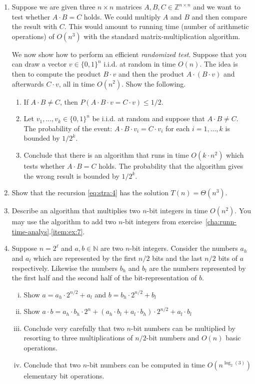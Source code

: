 \begin{enumerate}
\item Suppose we are given three $n×n$ matrices $A,B,C ∈ ℤ^{n×n}$ and we want to test whether $A ⋅ B = C$ holds. We could multiply $A$ and $B$ and then compare the result with $C$. This would amount to running time (number of arithmetic operations) of $O(n^3)$ with the standard matrix-multiplication algorithm. 

We now show how to perform an efficient \emph{randomized test}. Suppose that you can draw a vector $v ∈ \{0,1\}^n$  i.i.d. at random in time $O(n)$. The idea is then to compute the product $B ⋅v$ and then the product $A ⋅ (B ⋅v)$ and afterwards $C ⋅ v$, all in time $O(n^2)$. Show the following. 

\begin{enumerate}
\item If $A⋅B \neq C$, then $P(A ⋅ B ⋅v = C⋅v) ≤1/2$. 
\item Let $v_1,\dots,v_k∈ \{0,1\}^n$ be i.i.d. at random and suppose that  $A⋅B \neq C$. The probability of the event: $A ⋅ B ⋅v_i = C⋅v_i$ for each $i=1,\dots,k$ is bounded by $1/2^k$. 
\item Conclude that there is an algorithm that runs in time $O(k⋅n^2)$ which tests whether $A⋅B = C$ holds. The probability that the algorithm gives the wrong result is bounded by $1/2^k$. 
\end{enumerate}
\item Show that the recursion \eqref{eq:stra:4} has the solution $T(n) = Θ (n^3)$.  \label{item:str:4}
\item Describe an algorithm that multiplies two $n$-bit integers in time $O(n^2)$. You may use the algorithm to add two $n$-bit integers from exercise~\ref{cha:runn-time-analys}.\ref{item:ex:7}.  
\item Suppose $n = 2^\ell $  and $a,b ∈ ℕ$ are two $n$-bit integers. Consider the numbers $a_h$ and $a_l$ which are represented by the first $n/2$ bits and the last $n/2$ bits of $a$ respectively. Likewise the numbers $b_h$ and $b_l$ are the numbers represented by the first half and the second half of the bit-representation of $b$. 
  \begin{enumerate}[i)]
   \item Show $a = a_h ⋅ 2^{n/2} + a_l$ and  $b = b_h ⋅ 2^{n/2} + b_l$
  \item Show $a⋅b = a_h ⋅ b_h ⋅ 2^n + (a_h ⋅ b_l + a_l ⋅ b_h) ⋅2^{n/2} + a_l ⋅b_l$ 
  \item Conclude very carefully that two $n$-bit
    numbers can be multiplied by resorting to three multiplications of
    $n/2$-bit numbers and $O(n)$ basic  operations.
  \item Conclude that two $n$-bit
    numbers can be computed in time $O(n^{\log_2(3)})$
    elementary bit operations.
  \end{enumerate}


\end{enumerate}
